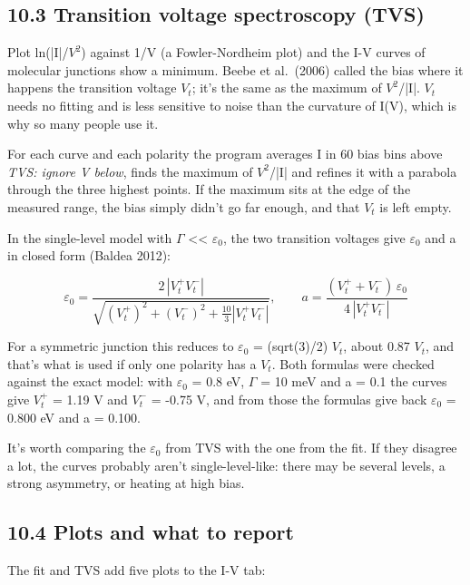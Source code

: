 \documentclass[
  11pt,
  a4paper,
]{article}
\begin{document}
\hypertarget{transition-voltage-spectroscopy-tvs}{%
\subsection{10.3 Transition voltage spectroscopy
(TVS)}\label{transition-voltage-spectroscopy-tvs}}

Plot ln(|I|/$V^{2}$) against 1/V (a Fowler-Nordheim plot) and the I-V
curves of molecular junctions show a minimum. Beebe et al.~(2006) called
the bias where it happens the transition voltage $V_t$; it's the same as
the maximum of $V^{2}$/|I|. $V_t$ needs no fitting and is less sensitive
to noise than the curvature of I(V), which is why so many people use it.

For each curve and each polarity the program averages I in 60 bias bins
above \emph{TVS: ignore \textbar V\textbar{} below}, finds the maximum
of $V^{2}$/|I| and refines it with a parabola through the three highest
points. If the maximum sits at the edge of the measured range, the bias
simply didn't go far enough, and that $V_t$ is left empty.

In the single-level model with $\Gamma$ \textless\textless{}
$\varepsilon_0$, the two transition voltages give $\varepsilon_0$ and a
in closed form (Baldea 2012):

\[
\varepsilon_0 = \frac{2\,|V_t^+ V_t^-|}{\sqrt{(V_t^+)^2 + (V_t^-)^2 + \frac{10}{3}|V_t^+ V_t^-|}}, \qquad a = \frac{(V_t^+ + V_t^-)\,\varepsilon_0}{4\,|V_t^+ V_t^-|}
\]

For a symmetric junction this reduces to $\varepsilon_0$ = (sqrt(3)/2)
$V_t$, about 0.87 $V_t$, and that's what is used if only one polarity
has a $V_t$. Both formulas were checked against the exact model: with
$\varepsilon_0$ = 0.8 eV, $\Gamma$ = 10 meV and a = 0.1 the curves give
$V_t^{+}$ = 1.19 V and $V_t^{-}$ = -0.75 V, and from those the formulas
give back $\varepsilon_0$ = 0.800 eV and a = 0.100.

It's worth comparing the $\varepsilon_0$ from TVS with the one from the
fit. If they disagree a lot, the curves probably aren't
single-level-like: there may be several levels, a strong asymmetry, or
heating at high bias.

\hypertarget{plots-and-what-to-report}{%
\subsection{10.4 Plots and what to
report}\label{plots-and-what-to-report}}

The fit and TVS add five plots to the I-V tab:
\end{document}
